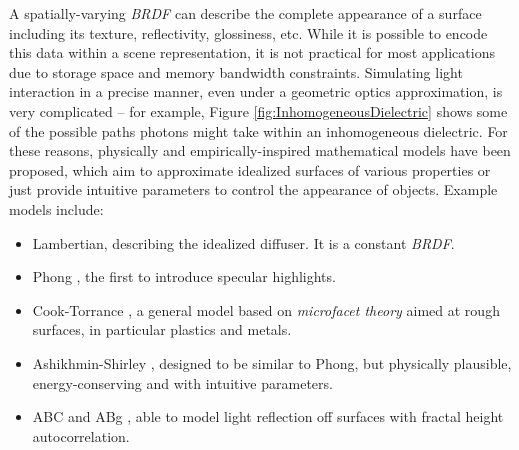 A spatially-varying \emph{BRDF} can describe the complete appearance of a surface including its texture, reflectivity, glossiness, etc. While it is possible to encode this data within a scene representation, it is not practical for most applications due to storage space and memory bandwidth constraints. Simulating light interaction in a precise manner, even under a geometric optics approximation, is very complicated -- for example, Figure \ref{fig:InhomogeneousDielectric} shows some of the possible paths photons might take within an inhomogeneous dielectric. For these reasons, physically and empirically-inspired mathematical models have been proposed, which aim to approximate idealized surfaces of various properties or just provide intuitive parameters to control the appearance of objects. Example models include:
\begin{itemize}
\item Lambertian, describing the idealized diffuser. It is a constant \emph{BRDF}.
\item Phong \cite{Phong}, the first to introduce specular highlights.
\item Cook-Torrance \cite{CookTorrance}, a general model based on \emph{microfacet theory} aimed at rough surfaces, in particular plastics and metals.
\item Ashikhmin-Shirley \cite{Ashikhmin00ananisotropic}, designed to be similar to Phong, but physically plausible, energy-conserving and with intuitive parameters.
\item ABC and ABg \cite{opticalScattering}, able to model light reflection off surfaces with fractal height autocorrelation.
\end{itemize}

